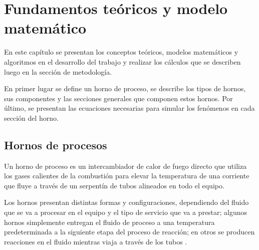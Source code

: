 \chapter{Fundamentos teóricos y modelo matemático}

\par En este capítulo se presentan los conceptos teóricos, modelos matemáticos y algoritmos en el desarrollo del trabajo y realizar los cálculos que se describen luego en la sección de metodología.
\par En primer lugar se define un horno de proceso, se describe los tipos de hornos, sus componentes y las secciones generales que componen estos hornos. Por último, se presentan las ecuaciones necesarias para simular los fenómenos en cada sección del horno.

\section{Hornos de procesos}
\par Un horno de proceso es un intercambiador de calor de fuego directo que utiliza los gases calientes de la combustión para elevar la temperatura de una corriente que fluye a través de un serpentín de tubos alineados en todo el equipo.
\par Los hornos presentan distintas formas y configuraciones, dependiendo del fluido que se va a procesar en el equipo y el tipo de servicio que va a prestar; algunos hornos simplemente entregan el fluido de proceso a una temperatura predeterminada a la siguiente etapa del proceso de reacción; en otros se producen reacciones en el fluido mientras viaja a través de los tubos \cite{bib:biset}.

